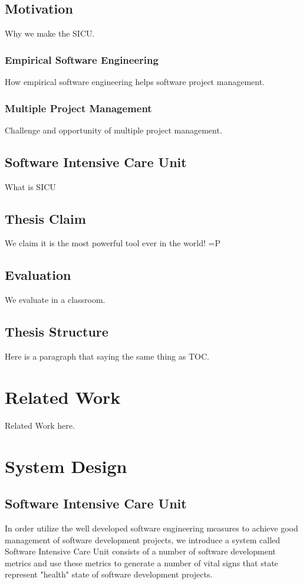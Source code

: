 \section{Motivation}
Why we make the SICU.

\subsection{Empirical Software Engineering}
How empirical software engineering helps software project management.

\subsection{Multiple Project Management}
Challenge and opportunity of multiple project management.

\section{Software Intensive Care Unit}
What is SICU

\section{Thesis Claim}
We claim it is the most powerful tool ever in the world! =P

\section{Evaluation}
We evaluate in a classroom.

\section{Thesis Structure}
Here is a paragraph that saying the same thing as TOC.

\chapter{Related Work}
Related Work here.

\chapter{System Design}
\section{Software Intensive Care Unit}
In order utilize the well developed software engineering measures to achieve good management of software development projects, we introduce a system called Software Intensive Care Unit consists of a number of software development metrics and use these metrics to generate a number of vital signs that state represent "health" state of software development projects.

